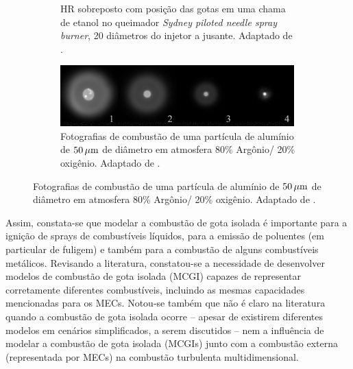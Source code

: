 \begin{figure}[H]
\begin{subfigure}[t]{0.59\textwidth}
        \vfill
        \caption{HR sobreposto com posição das gotas em uma chama de etanol no queimador \emph{Sydney piloted needle spray burner}, 20 diâmetros do injetor a jusante. Adaptado de \cite[Fig. 10]{SinghG2020}.}
        \label{fig:SinghG2020-10}
    \end{subfigure}
    \vspace{0.5cm}
    \begin{subfigure}[b]{0.8\textwidth}
        \centering
        \includegraphics[width=0.99\textwidth]{30_images/Braconnier202PhD-5.20.png}
        \caption{Fotografias de combustão de uma partícula de alumínio de $50 \, \mathrm{\mu m}$ de diâmetro em atmosfera 80\% Argônio/ 20\% oxigênio. Adaptado de \cite[Fig. 5.21]{Braconnier2022}.}
        \label{fig:Braconnier202PhD-5.20}
    \end{subfigure}
    \label{fig:sdc-exp}
\end{figure}


Assim, constata-se que modelar a combustão de gota isolada é importante para a ignição de sprays de combustíveis líquidos, para a emissão de poluentes (em particular de fuligem) e também para a combustão de alguns combustíveis metálicos. 
Revisando a literatura, constatou-se a necessidade de desenvolver modelos de combustão de gota isolada (MCGI) capazes de representar corretamente diferentes combustíveis, incluindo as mesmas capacidades mencionadas para os MECs.
Notou-se também que não é claro na literatura quando a combustão de gota isolada ocorre \cite[p. 8]{JennyB2012} -- apesar de existirem diferentes modelos em cenários simplificados, a serem discutidos -- nem a influência de modelar a combustão de gota isolada (MCGIs) junto com a combustão externa (representada por MECs) na combustão turbulenta multidimensional.


